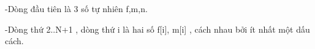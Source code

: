 -Dòng đầu tiên là 3 số tự nhiên f,m,n.  

   -Dòng thứ 2..N+1 , dòng thứ i là hai số f[i], m[i] , cách nhau bởi ít nhất một dấu cách.  

\